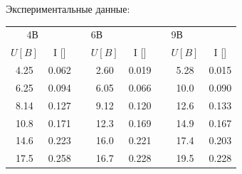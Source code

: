 \documentclass[a4paper,12pt]{article} %
\begin{document}
	\newpage
			Экспериментальные данные:\par	
			\begin{table}[h!]
				\centering
				\begin{tabular}{cclcclcc}
				\multicolumn{1}{r}{4В}                   & \multicolumn{1}{l}{}       &                       & \multicolumn{1}{l}{6В}          & \multicolumn{1}{l}{}       &                       & \multicolumn{1}{l}{9В}          & \multicolumn{1}{l}{}       \\ \cline{1-2} \cline{4-5} \cline{7-8} 
				\multicolumn{1}{|c|}{$U [B]$} 			 & \multicolumn{1}{c|}{I [\text{мА}]}& \multicolumn{1}{l|}{} & \multicolumn{1}{l|}{$U [B]$}    & \multicolumn{1}{c|}{{I [\text{мА}]}}     & \multicolumn{1}{l|}{} & \multicolumn{1}{c|}{$U [B]$}    & \multicolumn{1}{c|}{{I [\text{мА}]}}     \\ \cline{1-2} \cline{4-5} \cline{7-8} 
				\multicolumn{1}{|c|}{4.25}               & \multicolumn{1}{c|}{0.062} & \multicolumn{1}{l|}{} & \multicolumn{1}{c|}{2.60}       & \multicolumn{1}{c|}{0.019} & \multicolumn{1}{l|}{} & \multicolumn{1}{c|}{5.28}       & \multicolumn{1}{c|}{0.015} \\ \cline{1-2} \cline{4-5} \cline{7-8} 
				\multicolumn{1}{|c|}{6.25}               & \multicolumn{1}{c|}{0.094} & \multicolumn{1}{l|}{} & \multicolumn{1}{c|}{6.05}       & \multicolumn{1}{c|}{0.066} & \multicolumn{1}{l|}{} & \multicolumn{1}{c|}{10.0}       & \multicolumn{1}{c|}{0.090} \\ \cline{1-2} \cline{4-5} \cline{7-8} 
				\multicolumn{1}{|c|}{8.14}               & \multicolumn{1}{c|}{0.127} & \multicolumn{1}{l|}{} & \multicolumn{1}{c|}{9.12}       & \multicolumn{1}{c|}{0.120} & \multicolumn{1}{l|}{} & \multicolumn{1}{c|}{12.6}       & \multicolumn{1}{c|}{0.133} \\ \cline{1-2} \cline{4-5} \cline{7-8} 
				\multicolumn{1}{|c|}{10.8}               & \multicolumn{1}{c|}{0.171} & \multicolumn{1}{l|}{} & \multicolumn{1}{c|}{12.3}       & \multicolumn{1}{c|}{0.169} & \multicolumn{1}{l|}{} & \multicolumn{1}{c|}{14.9}       & \multicolumn{1}{c|}{0.167} \\ \cline{1-2} \cline{4-5} \cline{7-8} 
				\multicolumn{1}{|c|}{14.6}               & \multicolumn{1}{c|}{0.223} & \multicolumn{1}{l|}{} & \multicolumn{1}{c|}{16.0}       & \multicolumn{1}{c|}{0.221} & \multicolumn{1}{l|}{} & \multicolumn{1}{c|}{17.4}       & \multicolumn{1}{c|}{0.203} \\ \cline{1-2} \cline{4-5} \cline{7-8} 
				\multicolumn{1}{|c|}{17.5}               & \multicolumn{1}{c|}{0.258} & \multicolumn{1}{l|}{} & \multicolumn{1}{c|}{16.7}       & \multicolumn{1}{c|}{0.228} & \multicolumn{1}{l|}{} & \multicolumn{1}{c|}{19.5}       & \multicolumn{1}{c|}{0.228} \\ \cline{1-2} \cline{4-5} \cline{7-8} 

\end{tabular}
\end{table}
\end{document}
